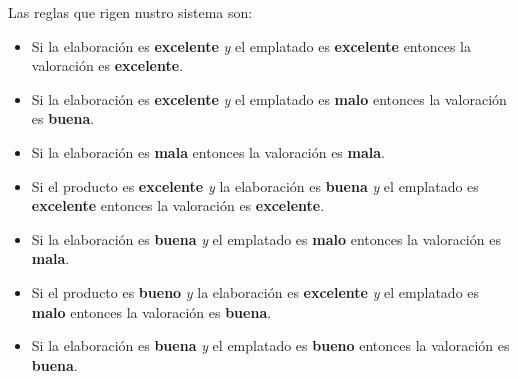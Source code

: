 \documentclass[12pt]{article}
\begin{document}
Las reglas que rigen nustro sistema son:
\begin{itemize}
	\item Si la elaboraci\'on es \textbf{excelente} \textit{y} el emplatado es \textbf{excelente} entonces la valoraci\'on es \textbf{excelente}.
	\item Si la elaboraci\'on es \textbf{excelente} \textit{y} el emplatado es \textbf{malo} entonces la valoraci\'on es \textbf{buena}.
	\item Si la elaboraci\'on es \textbf{mala} entonces la valoraci\'on es \textbf{mala}.
	\item Si el producto es \textbf{excelente} \textit{y} la elaboraci\'on es \textbf{buena} \textit{y} el emplatado es \textbf{excelente} entonces la valoraci\'on es \textbf{excelente}.
	\item Si la elaboraci\'on es \textbf{buena} \textit{y} el emplatado es \textbf{malo} entonces la valoraci\'on es \textbf{mala}.
	\item Si el producto es \textbf{bueno} \textit{y} la elaboraci\'on es \textbf{excelente} \textit{y} el emplatado es \textbf{malo} entonces la valoraci\'on es \textbf{buena}.
	\item Si la elaboraci\'on es \textbf{buena} \textit{y} el emplatado es \textbf{bueno} entonces la valoraci\'on es \textbf{buena}.
\end{itemize}
\end{document}
